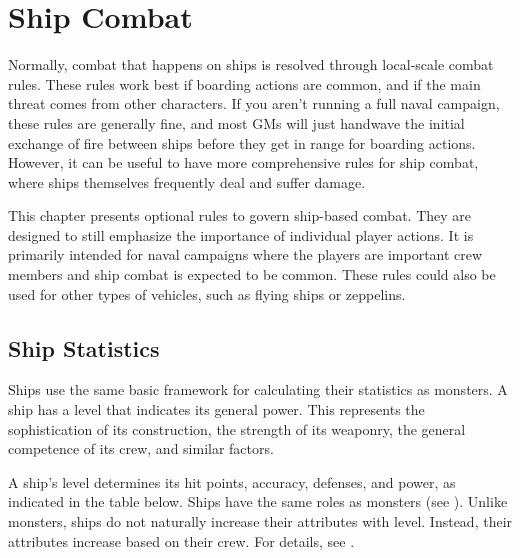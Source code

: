 \chapter{Ship Combat}
Normally, combat that happens on ships is resolved through local-scale combat rules.
These rules work best if boarding actions are common, and if the main threat comes from other characters.
If you aren't running a full naval campaign, these rules are generally fine, and most GMs will just handwave the initial exchange of fire between ships before they get in range for boarding actions.
However, it can be useful to have more comprehensive rules for ship combat, where ships themselves frequently deal and suffer damage.

This chapter presents optional rules to govern ship-based combat.
They are designed to still emphasize the importance of individual player actions.
It is primarily intended for naval campaigns where the players are important crew members and ship combat is expected to be common.
These rules could also be used for other types of vehicles, such as flying ships or zeppelins.

\section{Ship Statistics}
  Ships use the same basic framework for calculating their statistics as monsters.
  A ship has a level that indicates its general power.
  This represents the sophistication of its construction, the strength of its weaponry, the general competence of its crew, and similar factors.

  A ship's level determines its hit points, accuracy, defenses, and power, as indicated in the table below.
  Ships have the same roles as monsters (see ).
  Unlike monsters, ships do not naturally increase their attributes with level.
  Instead, their attributes increase based on their crew.
  For details, see .

